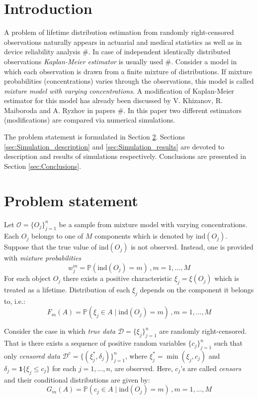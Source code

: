 \documentclass[12pt,reqno,a4paper,oneside,draft]{article}
\theoremstyle{plain}
\theoremstyle{definition}
\theoremstyle{remark}
\begin{document}
\tableofcontents


\section{Introduction}
\label{sec:Introduction}
A problem of lifetime distribution estimation from randomly right-censored observations naturally appears in actuarial and medical statistics as well as in device reliability analysis $\#$. In case of independent identically distributed observations \emph{Kaplan-Meier estimator} is usually used $\#$. Consider a model in which each observation is drawn from a finite mixture of distributions. If mixture probabilities (concentrations) varies through the observations, this model is called \emph{mixture model with varying concentrations}. A modification of Kaplan-Meier estimator for this model has already been discussed by V. Khizanov, R. Maiboroda and A. Ryzhov in papers $\#$. In this paper two different estimators (modifications) are compared via numerical simulations.

The problem statement is formulated in Section \ref{sec:Problem_statement}. Sections \ref{sec:Simulation_description} and \ref{sec:Simulation_results} are devoted to description and results of simulations respectively. Conclusions are presented in Section \ref{sec:Conclusions}.

\section{Problem statement}
\label{sec:Problem_statement}
Let $\mathcal O = \{O_j\}_{j=1}^n$ be a sample from mixture model with varying concentrations. Each $O_j$ belongs to one of $M$ components which is denoted by $\mathrm{ind}(O_j)$. Suppose that the true value of $\mathrm{ind}(O_j)$ is not observed. Instead, one is provided with \emph{mixture probabilities}
\begin{equation}
w_j^m = \mathbb P(\mathrm{ind}(O_j) = m)\, ,m=1,\ldots, M
\end{equation}
For each object $O_j$ there exists a positive characteristic $\xi _j = \xi (O_j)$ which is treated as a lifetime. Distribution of each $\xi _j$ depends on the component it belongs to, i.e.:
\begin{equation}
F_m (A) = \mathbb P(\xi _j \in A \mid \mathrm{ind}(O_j) = m)\, , m=1,\ldots , M
\end{equation}

Consider the case in which \emph{true data} $\mathcal D = \{\xi _j\}_{j=1}^n$ are randomly right-censored. That is there exists a sequence of positive random variables $\{c_j\}_{j=1}^n$ such that only \emph{censored data} $\mathcal D^c = \{(\xi _j^*, \delta _j)\}_{j=1}^n$, where $\xi _j^* = \min (\xi _j, c_j)$ and $\delta _j = \mathbf 1\{\xi _j \leq c_j\}$ for each $j=1,\ldots ,n$, are observed. Here, $c_j$'s are called \emph{censors} and their conditional distributions are given by:
\begin{equation}
G_m (A) = \mathbb P(c _j \in A \mid \mathrm{ind}(O_j) = m)\, , m=1,\ldots , M
\end{equation} 
\end{document}
